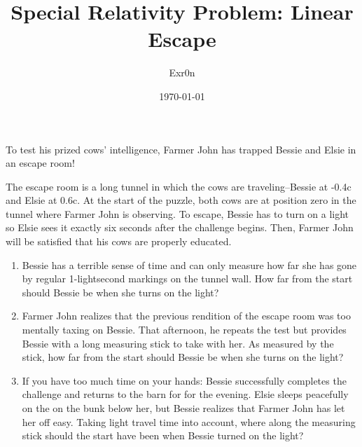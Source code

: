 \documentclass[letterpaper]{article}
\author{Exr0n}
\date{\today}
\title{Special Relativity Problem: Linear Escape}
\renewcommand{\tableofcontents}{}
\begin{document}
\tableofcontents

To test his prized cows' intelligence, Farmer John has trapped Bessie and Elsie in an escape room!

The escape room is a long tunnel in which the cows are traveling--Bessie at -0.4c and Elsie at 0.6c. At the start of the puzzle, both cows are at position zero in the tunnel where Farmer John is observing. To escape, Bessie has to turn on a light so Elsie sees it exactly six seconds after the challenge begins. Then, Farmer John will be satisfied that his cows are properly educated.

\begin{enumerate}
\item Bessie has a terrible sense of time and can only measure how far she has gone by regular 1-lightsecond markings on the tunnel wall. How far from the start should Bessie be when she turns on the light?

\item Farmer John realizes that the previous rendition of the escape room was too mentally taxing on Bessie. That afternoon, he repeats the test but provides Bessie with a long measuring stick to take with her. As measured by the stick, how far from the start should Bessie be when she turns on the light?

\item If you have too much time on your hands: Bessie successfully completes the challenge and returns to the barn for for the evening. Elsie sleeps peacefully on the on the bunk below her, but Bessie realizes that Farmer John has let her off easy. Taking light travel time into account, where along the measuring stick should the start have been when Bessie turned on the light?
\end{enumerate}
\end{document}
